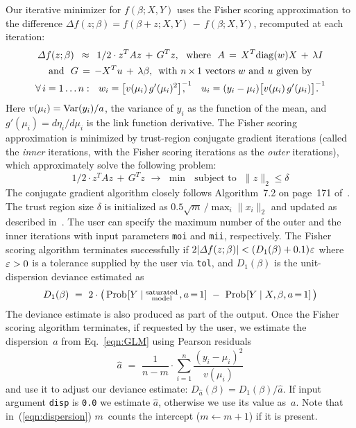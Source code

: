 Our iterative minimizer for $f(\beta; X, Y)$ uses the Fisher scoring approximation
to the difference $\varDelta f(z; \beta) = f(\beta + z; X, Y) \,-\, f(\beta; X, Y)$,
recomputed at each iteration:
\begin{gather*}
\varDelta f(z; \beta) \,\,\,\approx\,\,\, 1/2 \cdot z^T A z \,+\, G^T z,
\,\,\,\,\textrm{where}\,\,\,\, A \,=\, X^T\!\diag(w) X \,+\, \lambda I\\
\textrm{and}\,\,\,\,G \,=\, - X^T u \,+\, \lambda\beta,
\,\,\,\textrm{with $n\,{\times}\,1$ vectors $w$ and $u$ given by}\\
\forall\,i = 1\ldots n: \,\,\,\,
w_i = \big[v(\mu_i)\,g'(\mu_i)^2\big]^{-1}
\!\!\!\!\!\!,\,\,\,\,\,\,\,\,\,
u_i = (y_i - \mu_i)\big[v(\mu_i)\,g'(\mu_i)\big]^{-1}
\!\!\!\!\!\!.\,\,\,\,
\end{gather*}
Here $v(\mu_i)=\mathop{\mathrm{Var}}\nolimits(y_i)/a$, the variance of $y_i$ as the function of the mean, and
$g'(\mu_i) = d \eta_i/d \mu_i$ is the link function derivative.  The Fisher scoring
approximation is minimized by trust-region conjugate gradient iterations (called the
\emph{inner} iterations, with the Fisher scoring iterations as the \emph{outer}
iterations), which approximately solve the following problem:
\begin{equation*}
1/2 \cdot z^T A z \,+\, G^T z \,\,\to\,\,\min\,\,\,\,\textrm{subject to}\,\,\,\,
\|z\|_2 \leq \delta
\end{equation*}
The conjugate gradient algorithm closely follows Algorithm~7.2 on page~171
of~\cite{Nocedal2006:Optimization}.
The trust region size $\delta$ is initialized as $0.5\sqrt{m}\,/ \max\nolimits_i \|x_i\|_2$
and updated as described in~\cite{Nocedal2006:Optimization}.
The user can specify the maximum number of the outer and the inner iterations with
input parameters {\tt moi} and {\tt mii}, respectively.  The Fisher scoring algorithm
terminates successfully if $2|\varDelta f(z; \beta)| < (D_1(\beta) + 0.1)\hspace{0.5pt}\varepsilon$
where $\varepsilon > 0$ is a tolerance supplied by the user via {\tt tol}, and $D_1(\beta)$ is
the unit-dispersion deviance estimated as
\begin{equation*}
D_1(\beta) \,\,=\,\, 2 \cdot \big(\mathop{\mathrm{Prob}\hspace{0.5pt}}\nolimits[Y \mid \!
\begin{smallmatrix}\textrm{saturated}\\\textrm{model}\end{smallmatrix}, a\,{=}\,1]
\,\,-\,\,\mathop{\mathrm{Prob}\hspace{0.5pt}}\nolimits[Y \mid X, \beta, a\,{=}\,1]\,\big)
\end{equation*}
The deviance estimate is also produced as part of the output.  Once the Fisher scoring
algorithm terminates, if requested by the user, we estimate the dispersion~$a$ from
Eq.~\ref{eqn:GLM} using Pearson residuals
\begin{equation}
\hat{a} \,\,=\,\, \frac{1}{n-m}\cdot \sum_{i=1}^n \frac{(y_i - \mu_i)^2}{v(\mu_i)}
\label{eqn:dispersion}
\end{equation}
and use it to adjust our deviance estimate: $D_{\hat{a}}(\beta) = D_1(\beta)/\hat{a}$.
If input argument {\tt disp} is {\tt 0.0} we estimate $\hat{a}$, otherwise we use its
value as~$a$.  Note that in~(\ref{eqn:dispersion}) $m$~counts the intercept
($m \leftarrow m+1$) if it is present.

